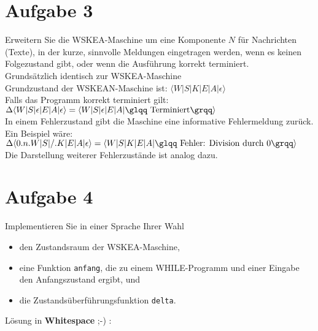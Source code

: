 \documentclass[ngerman,a4paper]{report}
\begin{document}
\section*{Aufgabe 3}
Erweitern Sie die WSKEA-Maschine um eine Komponente $N$ für Nachrichten (Texte), in der kurze, sinnvolle Meldungen eingetragen werden, wenn es keinen Folgezustand gibt, oder wenn die Ausführung korrekt terminiert.\\

Grundsätzlich identisch zur WSKEA-Maschine\\

Grundzustand der WSKEAN-Maschine ist: $\langle W|S|K|E|A|\epsilon\rangle$\\

Falls das Programm korrekt terminiert gilt: $\Delta\langle W|S|\epsilon|E|A|\epsilon\rangle = \langle W|S|\epsilon|E|A|\text{\glqq Terminiert\grqq} \rangle$\\

In einem Fehlerzustand gibt die Maschine eine informative Fehlermeldung zurück. Ein Beispiel wäre:\\

$\Delta\langle 0.n.W|S|/.K|E|A|\epsilon\rangle = \langle W|S|K|E|A|\text{\glqq Fehler: Division durch 0\grqq}\rangle$\\

Die Darstellung weiterer Fehlerzustände ist analog dazu.

\section*{Aufgabe 4 }
Implementieren Sie in einer Sprache Ihrer Wahl
\begin{itemize}
	\item den Zustandsraum der WSKEA-Maschine,
	\item eine Funktion \texttt{anfang}, die zu einem WHILE-Programm und einer Eingabe den Anfangszustand ergibt, und
	\item die Zustandsüberführungsfunktion \texttt{delta}.
\end{itemize}

Lösung in \textbf{Whitespace} ;-) :
\end{document}
